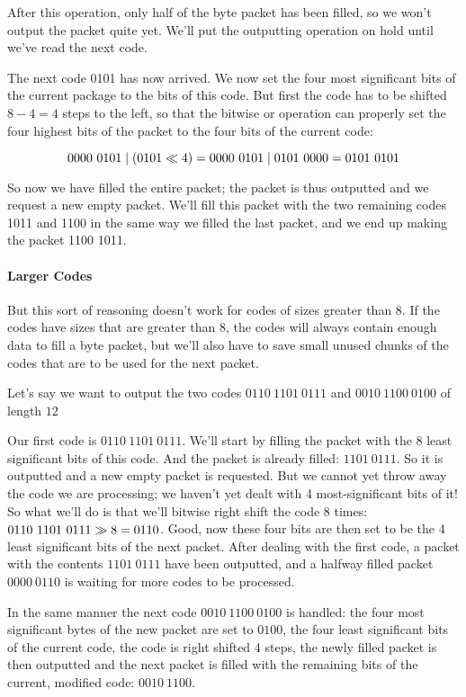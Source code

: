 After this operation, only half of the byte packet has been filled, so
we won't output the packet quite yet. We'll put the outputting
operation on hold until we've read the next code.

The next code 0101 has now arrived. We now set the four most
significant bits of the current package to the bits of this code. But
first the code has to be shifted $8 -4 = 4$ steps to the left, so that
the bitwise or operation can properly set the four highest bits of the
packet to the four bits of the current code:

\begin{equation*}
  0000\ 0101 \mathrel{|} (0101 \ll 4) = 0000\ 0101 \mathrel{|} 0101\ 0000 =
  0101\ 0101
\end{equation*}

So now we have filled the entire packet; the packet is thus outputted
and we request a new empty packet. We'll fill this packet with the two
remaining codes 1011 and 1100 in the same way we filled the last
packet, and we end up making the packet 1100 1011.

\paragraph{Larger Codes}

But this sort of reasoning doesn't work for codes of sizes greater
than $8$. If the codes have sizes that are greater than $8$, the codes
will always contain enough data to fill a byte packet, but we'll also
have to save small unused chunks of the codes that are to be used for
the next packet.

Let's say we want to output the two codes $0110\ 1101\ 0111$ and $0010\ 1100\
0100$ of length $12$

Our first code is $0110\ 1101\ 0111$. We'll start by filling the
packet with the 8 least significant bits of this code. And the packet
is already filled: $1101\ 0111$. So it is outputted and a new empty
packet is requested. But we cannot yet throw away the code we are
processing; we haven't yet dealt with 4 most-significant bits of it!
So what we'll do is that we'll bitwise right shift the code 8 times:
\mbox{$0110\ 1101\ 0111 \ShiftRight 8 = 0110$}. Good, now these four
bits are then set to be the 4 least significant bits of the next
packet. After dealing with the first code, a packet with the contents
$1101\ 0111$ have been outputted, and a halfway filled packet $0000\ 0110$ is
waiting for more codes to be processed.

In the same manner the next code $0010\ 1100\ 0100$ is handled: the
four most significant bytes of the new packet are set to $0100$, the
four least significant bits of the current code, the code is right
shifted 4 steps, the newly filled packet is then outputted and the
next packet is filled with the remaining bits of the current, modified
code: $0010\ 1100$.

